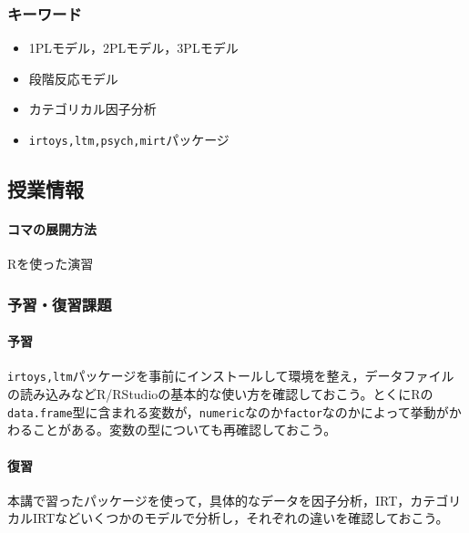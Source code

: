 \subsubsection{キーワード}
\begin{itemize}
	\item 1PLモデル，2PLモデル，3PLモデル
	\item 段階反応モデル
	\item カテゴリカル因子分析
	\item \texttt{irtoys,ltm,psych,mirt}パッケージ
\end{itemize}
\subsection{授業情報}
\paragraph{コマの展開方法}
Rを使った演習
\subsubsection{予習・復習課題}
\paragraph{予習} \texttt{irtoys,ltm}パッケージを事前にインストールして環境を整え，データファイルの読み込みなどR/RStudioの基本的な使い方を確認しておこう。とくにRの\texttt{data.frame}型に含まれる変数が，\texttt{numeric}なのか\texttt{factor}なのかによって挙動がかわることがある。変数の型についても再確認しておこう。
\paragraph{復習}本講で習ったパッケージを使って，具体的なデータを因子分析，IRT，カテゴリカルIRTなどいくつかのモデルで分析し，それぞれの違いを確認しておこう。
